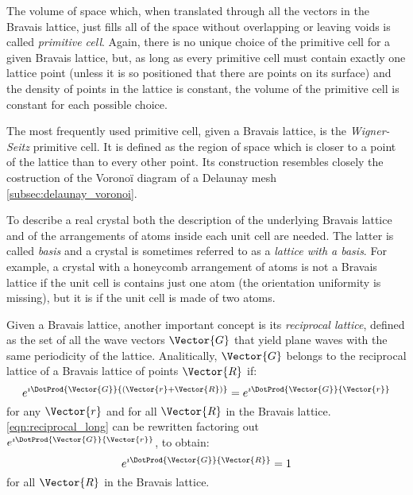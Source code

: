 The volume of space which, when translated through all the vectors in
the Bravais lattice, just fills all of the space without overlapping
or leaving voids is called \emph{primitive cell}. Again, there is no
unique choice of the primitive cell for a given Bravais lattice, but,
as long as every primitive cell must contain exactly one lattice point
(unless it is so positioned that there are points on its surface) and
the density of points in the lattice is constant, the volume of the
primitive cell is constant for each possible choice.


The most frequently used primitive cell, given a Bravais lattice, is
the \emph{Wigner-Seitz} primitive cell. It is defined as the region of
space which is closer to a point of the lattice than to every other
point. Its construction resembles closely the costruction of the
Vorono\"i diagram of a Delaunay mesh \ref{subsec:delaunay_voronoi}.


To describe a real crystal both the description of the underlying
Bravais lattice and of the arrangements of atoms inside each unit cell
are needed. The latter is called \emph{basis} and a crystal is
sometimes referred to as a \emph{lattice with a basis}. For example, a
crystal with a honeycomb arrangement of atoms is not a Bravais lattice
if the unit cell is contains just one atom (the orientation uniformity
is missing), but it is if the unit cell is made of two atoms.


Given a Bravais lattice, another important concept is its
\emph{reciprocal lattice}, defined as the set of all the wave vectors
$\Vector{G}$ that yield plane waves with the same periodicity of the
lattice. Analitically, $\Vector{G}$ belongs to the reciprocal lattice
of a Bravais lattice of points $\Vector{R}$ if:
\begin{equation} \label{eqn:reciprocal_long}
  e^{\imath \DotProd{\Vector{G}}{(\Vector{r}+\Vector{R})}} = e^{\imath
  \DotProd{\Vector{G}}{\Vector{r}}}
\end{equation}
for any $\Vector{r}$ and for all $\Vector{R}$ in the Bravais
lattice. \ref{eqn:reciprocal_long} can be rewritten factoring out
$e^{\imath \DotProd{\Vector{G}}{\Vector{r}}}$, to obtain:
\begin{equation} \label{eqn:reciprocal}
  e^{\imath \DotProd{\Vector{G}}{\Vector{R}}} = 1
\end{equation}
for all $\Vector{R}$ in the Bravais lattice.

